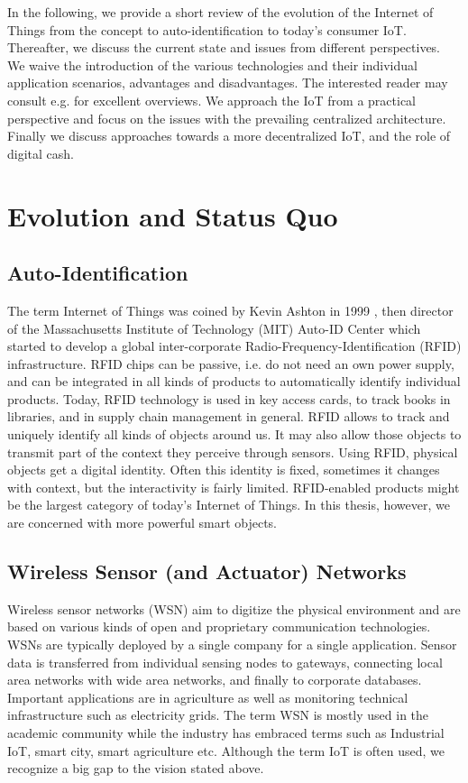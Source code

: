 In the following, we provide a short review of the evolution of the Internet of Things from the concept to auto-identification to today's consumer IoT. Thereafter, we discuss the current state and issues from different perspectives. We waive the introduction of the various technologies and their individual application scenarios, advantages and disadvantages. The interested reader may consult e.g. \parencite{Atzori20102787,Mattern2010,Gubbi20131645} for excellent overviews. We approach the IoT from a practical perspective and focus on the issues with the prevailing centralized architecture. Finally we discuss approaches towards a more decentralized IoT, and the role of digital cash.

\section{Evolution and Status Quo}

\subsection{Auto-Identification}

The term Internet of Things was coined by Kevin Ashton in 1999 \parencite[c.f ][]{ashton2009internet}, then director of the Massachusetts Institute of Technology (MIT) Auto-ID Center which started to develop a global inter-corporate Radio-Frequency-Identification (RFID) infrastructure. RFID chips can be passive, i.e. do not need an own power supply, and can be integrated in all kinds of products to automatically identify individual products. Today, RFID technology is used in key access cards, to track books in libraries, and in supply chain management in general. RFID allows to track and uniquely identify all kinds of objects around us. It may also allow those objects to transmit part of the context they perceive through sensors. Using RFID, physical objects get a digital identity. Often this identity is fixed, sometimes it changes with context, but the interactivity is fairly limited. RFID-enabled products might be the largest category of today's Internet of Things. In this thesis, however, we are concerned with more powerful smart objects.  

\subsection{Wireless Sensor (and Actuator) Networks}

Wireless sensor networks (WSN) aim to digitize the physical environment and are based on various kinds of open and proprietary communication technologies. WSNs are typically deployed by a single company for a single application. Sensor data is transferred from individual sensing nodes to gateways, connecting local area networks with wide area networks, and finally to corporate databases. Important applications are in agriculture as well as monitoring technical infrastructure such as electricity grids. The term WSN is mostly used in the academic community while the industry has embraced terms such as Industrial IoT, smart city, smart agriculture etc. Although the term IoT is often used, we recognize a big gap to the vision stated above.

